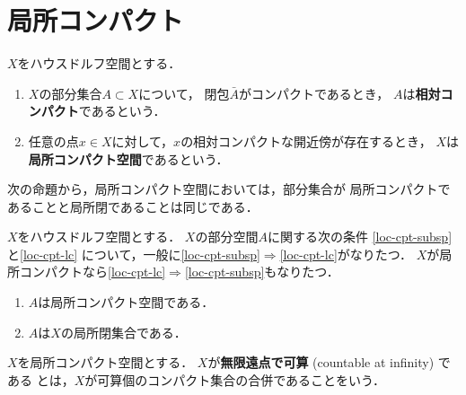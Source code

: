 \section{局所コンパクト}

\begin{leftbar}
\begin{DFN}
    \(X\)をハウスドルフ空間とする．
    \begin{enumerate}
        \item \(X\)の部分集合\(A\subset X\)について，
        閉包\(\bar{A}\)がコンパクトであるとき，
        \(A\)は\textbf{相対コンパクト}であるという．
        \item 任意の点\(x\in X\)に対して，\(x\)の相対コンパクトな開近傍が存在するとき，
        \(X\)は\textbf{局所コンパクト空間}であるという．
    \end{enumerate}
\end{DFN}
\end{leftbar}

次の命題から，局所コンパクト空間においては，部分集合が
局所コンパクトであることと局所閉であることは同じである．

\begin{PRP}
    \(X\)をハウスドルフ空間とする．
    \(X\)の部分空間\(A\)に関する次の条件
    \eqref{loc-cpt-subsp}と\eqref{loc-cpt-lc}
    について，一般に\eqref{loc-cpt-subsp}\(\Rightarrow\)\eqref{loc-cpt-lc}がなりたつ．
    \(X\)が局所コンパクトなら\eqref{loc-cpt-lc}\(\Rightarrow\)\eqref{loc-cpt-subsp}もなりたつ．
    \begin{enumerate}[(1)]%
        \item \(A\)は局所コンパクト空間である．\label{loc-cpt-subsp}
        \item \(A\)は\(X\)の局所閉集合である．\label{loc-cpt-lc}
    \end{enumerate}    
\end{PRP}

\begin{leftbar}    
\begin{DFN}
    \(X\)を局所コンパクト空間とする．
    \(X\)が\textbf{無限遠点で可算} (countable at infinity) である
    とは，\(X\)が可算個のコンパクト集合の合併であることをいう．
\end{DFN}
\end{leftbar}

